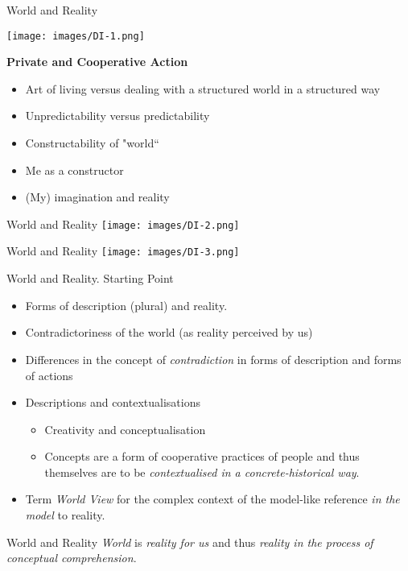 \documentclass{beamer}
\begin{document}
\begin{frame}{World and Reality}

  \begin{minipage}{.4\textwidth}\centering
    \texttt{[image: images/DI-1.png]}
  \end{minipage}\hfill
  \begin{minipage}{.55\textwidth}
    \begin{center}\bf      Private and Cooperative Action    \end{center}

    \begin{itemize}
    \item Art of living versus dealing with a structured world in a structured
      way
    \item Unpredictability versus predictability
    \item Constructability of "world“
    \item Me as a constructor
    \item (My) imagination and reality
    \end{itemize}
  \end{minipage}

\end{frame}
\begin{frame}{World and Reality}\centering
    \texttt{[image: images/DI-2.png]}
\end{frame}
\begin{frame}{World and Reality}\centering
    \texttt{[image: images/DI-3.png]}
\end{frame}
\begin{frame}{World and Reality. Starting Point}
  \begin{itemize}
  \item Forms of description (plural) and reality.
  \item Contradictoriness of the world (as reality perceived by us)
  \item Differences in the concept of \emph{contradiction} in forms of
    description and forms of actions
  \item Descriptions and contextualisations
    \begin{itemize}
    \item Creativity and conceptualisation
    \item Concepts are a form of cooperative practices of people and thus
      themselves are to be \emph{contextualised in a concrete-historical way}.
    \end{itemize}
  \item Term \emph{World View} for the complex context of the model-like
    reference \emph{in the model} to reality.
  \end{itemize}
  \begin{block}{World and Reality}
    \emph{World} is \emph{reality for us} and thus \emph{reality in the
      process of conceptual comprehension}.
  \end{block}
\end{frame}
\end{document}
